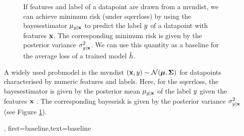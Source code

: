 {{\begin{figure}[h]
\begin{center}
		\end{center}
		\caption{If \gls{feature}s and \gls{label} of a \gls{datapoint} are drawn from a \gls{mvndist}, we 
		can achieve minimum \gls{risk} (under \gls{sqerrloss}) by using the \gls{bayesestimator} $\mu_{y|{\bf x}}$ 
		to predict the \gls{label} $y$ of a \gls{datapoint} with \gls{feature}s ${\bf x}$. The corresponding 
		minimum \gls{risk} is given by the posterior \gls{variance} $\sigma^{2}_{y|{\bf x}}$. We can use 
		this quantity as a baseline for the average \gls{loss} of a trained \gls{model} $\hat{h}$. \label{fig_post_baseline}}
	\end{figure}
A widely used \gls{probmodel} is the \gls{mvndist} $\left( {\bf x},y \right) \sim \mathcal{N}({\bm \mu},{\bm \Sigma})$ 
for \gls{datapoint}s characterised by numeric \gls{feature}s and \gls{label}s.
Here, for the \gls{sqerrloss}, the \gls{bayesestimator} is given by the posterior 
mean $\mu_{y|{\bf x}}$ of the \gls{label} $y$ given the 
\gls{feature}s ${\bf x}$ \cite{LC,GrayProbBook}. The corresponding \gls{bayesrisk} 
is given by the posterior \gls{variance} 
$\sigma^{2}_{y|{\bf x}}$ (see Figure \ref{fig_post_baseline}).},
    first={baseline},text={baseline}
}

